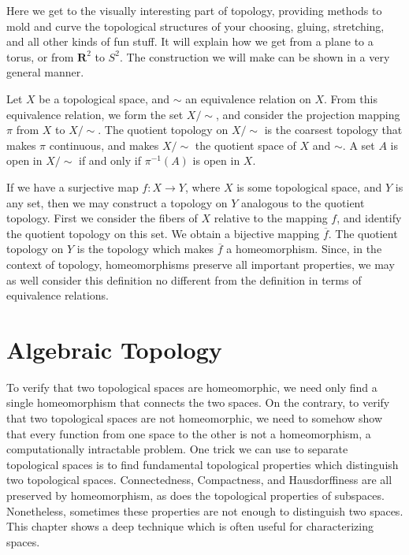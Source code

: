 Here we get to the visually interesting part of topology, providing methods to mold and curve the topological structures of your choosing, gluing, stretching, and all other kinds of fun stuff. It will explain how we get from a plane to a torus, or from $\mathbf{R}^2$ to $S^2$. The construction we will make can be shown in a very general manner.

\begin{definition}
    Let $X$ be a topological space, and $\sim$ an equivalence relation on $X$. From this equivalence relation, we form the set $X/\sim$, and consider the projection mapping $\pi$ from $X$ to $X/\sim$. The quotient topology on $X/\sim$ is the coarsest topology that makes $\pi$ continuous, and makes $X/\sim$ the quotient space of $X$ and $\sim$. A set $A$ is open in $X/\sim$ if and only if $\pi^{-1}(A)$ is open in $X$.
\end{definition}

If we have a surjective map $f:X \to Y$, where $X$ is some topological space, and $Y$ is any set, then we may construct a topology on $Y$ analogous to the quotient topology. First we consider the fibers of $X$ relative to the mapping $f$, and identify the quotient topology on this set. We obtain a bijective mapping $\overline{f}$. The quotient topology on $Y$ is the topology which makes $\overline{f}$ a homeomorphism. Since, in the context of topology, homeomorphisms preserve all important properties, we may as well consider this definition no different from the definition in terms of equivalence relations.

\chapter{Algebraic Topology}

To verify that two topological spaces are homeomorphic, we need only find a single homeomorphism that connects the two spaces. On the contrary, to verify that two topological spaces are not homeomorphic, we need to somehow show that every function from one space to the other is not a homeomorphism, a computationally intractable problem. One trick we can use to separate topological spaces is to find fundamental topological properties which distinguish two topological spaces. Connectedness, Compactness, and Hausdorffiness are all preserved by homeomorphism, as does the topological properties of subspaces. Nonetheless, sometimes these properties are not enough to distinguish two spaces. This chapter shows a deep technique which is often useful for characterizing spaces.

